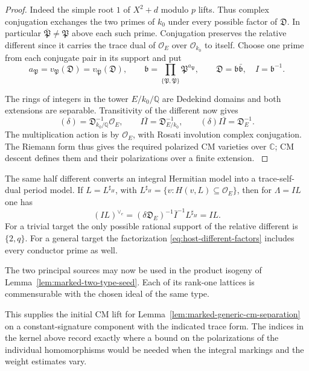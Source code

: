 \begin{proof}
Indeed the simple root \(1\) of \(X^2+d\) modulo \(p\) lifts.
Thus complex conjugation exchanges the two primes of \(k_0\)
under every possible factor of \(\mathfrak D\). In particular
\(\bar{\mathfrak P}\ne\mathfrak P\) above each such prime.
Conjugation preserves the relative different since it carries the
trace dual of \(\mathcal O_E\) over \(\mathcal O_{k_0}\) to itself.
Choose one prime from each conjugate pair in its support and put
\begin{equation}\label{eq:host-different-factors}
 a_{\mathfrak P}=v_{\mathfrak P}(\mathfrak D)
                  =v_{\bar{\mathfrak P}}(\mathfrak D),\qquad
 \mathfrak b=\prod_{\{\mathfrak P,\bar{\mathfrak P}\}}
                   \mathfrak P^{a_{\mathfrak P}},\qquad
 \mathfrak D=\mathfrak b\bar{\mathfrak b},\quad I=\mathfrak b^{-1}.
\end{equation}

The rings of integers in the tower \(E/k_0/\mathbb Q\) are
Dedekind domains and both extensions are separable.
Transitivity of the different \cite[Proposition~12.28]{sutherland-local-fields}
now gives
\[
   (\delta)=\mathfrak D_{k_0/\mathbb Q}^{-1}\mathcal O_E,\qquad
   I\bar I=\mathfrak D_{E/k_0}^{-1},\qquad
   (\delta)I\bar I=\mathfrak D_E^{-1}.
\]
The multiplication action is by \(\mathcal O_E\), with Rosati
involution complex conjugation. The Riemann form thus gives the
required polarized CM varieties over \(\mathbb C\); CM descent
defines them and their polarizations over a finite extension.
\cite{cm-reciprocity}
\end{proof}

The same half different converts an integral Hermitian model into
a trace-self-dual period model. If \(L=L^{\sharp_H}\), with
\(L^{\sharp_H}=\{v:H(v,L)\subseteq\mathcal O_E\}\), then for
\(\Lambda=I L\) one has
\[
 (IL)^{\vee_e}
     =(\delta\mathfrak D_E)^{-1}\bar I^{-1} L^{\sharp_H}
     =I L .
\]
For a trivial target the only possible rational support of the
relative different is \(\{2,q\}\). For a general target the
factorization \eqref{eq:host-different-factors} includes every
conductor prime as well.

The two principal sources may now be used in the product isogeny
of Lemma~\ref{lem:marked-two-type-seed}. Each of its rank-one
lattices is commensurable with the chosen ideal of the same type.

This supplies the initial CM lift for
Lemma~\ref{lem:marked-generic-cm-separation} on a constant-signature
component with the indicated trace form. The indices in the kernel
above record exactly where a bound on the polarizations of the
individual homomorphisms would be needed when the integral markings
and the weight estimates vary.

